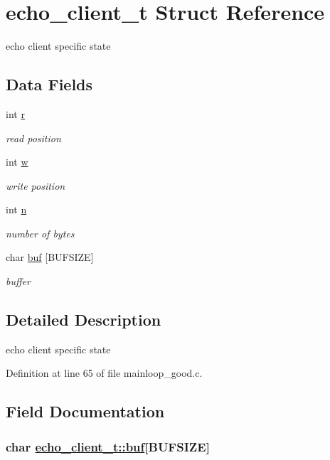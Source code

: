 \hypertarget{structecho__client__t}{
\section{echo\_\-client\_\-t Struct Reference}
\label{structecho__client__t}
}
echo client specific state  


\subsection*{Data Fields}
\begin{CompactItemize}
\item 
int \hyperlink{structecho__client__t_o0}{r}
\begin{CompactList}\small\item\em read position \item\end{CompactList}\item 
int \hyperlink{structecho__client__t_o1}{w}
\begin{CompactList}\small\item\em write position \item\end{CompactList}\item 
int \hyperlink{structecho__client__t_o2}{n}
\begin{CompactList}\small\item\em number of bytes \item\end{CompactList}\item 
char \hyperlink{structecho__client__t_o3}{buf} \mbox{[}BUFSIZE\mbox{]}
\begin{CompactList}\small\item\em buffer \item\end{CompactList}\end{CompactItemize}


\subsection{Detailed Description}
echo client specific state 



Definition at line 65 of file mainloop\_\-good.c.

\subsection{Field Documentation}
\hypertarget{structecho__client__t_o3}{
\subsubsection[buf]{\setlength{\rightskip}{0pt plus 5cm}char \hyperlink{structecho__client__t_o3}{echo\_\-client\_\-t::buf}\mbox{[}BUFSIZE\mbox{]}}}
\label{structecho__client__t_o3}


